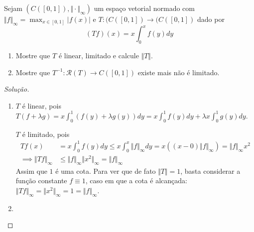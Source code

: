 \documentclass{article}
\theoremstyle{definition}
\numberwithin{equation}{section}
\begin{document}
	\begin{exer}
		Sejam $(C([0,1]),\Vert\cdot\Vert_\infty)$ um espaço vetorial normado com $\Vert f\Vert_\infty=\max_{x\in[0,1]}|f(x)|$ e $T:(C([0,1])\to (C([0,1])$ dado por
		\[(Tf)(x)=x\int_0^xf(y)dy\]
		\begin{enumerate}
			\item Mostre que $T$ é linear, limitado e calcule $\Vert T\Vert$.
			\item Mostre que $T^{-1}:\mathcal{R}(T)\to C([0,1])$ existe mais não é limitado.
		\end{enumerate}
	\end{exer}
	\begin{proof}[Solução]\leavevmode
		\begin{enumerate}
			\item $T$ é linear, pois $T(f+\lambda g)=x\int_0^1(f(y)+\lambda g(y))dy=x\int_0^1f(y)dy+\lambda x\int_0^1g(y)dy$.
			
			$T$ é limitado, pois
			\begin{align*}
				Tf(x)&=x\int_0^1f(y)dy\leq x\int_0^x\Vert f\Vert_\infty dy= x\left((x-0)\Vert f\Vert_\infty\right)=\Vert f\Vert_\infty x^2\\
				\implies
				\Vert Tf\Vert_\infty&\leq \Vert f\Vert_\infty \Vert x^2\Vert_\infty=\Vert f\Vert_\infty
			\end{align*}
			Assim que $1$ é uma cota. Para ver que de fato $\Vert T\Vert=1$, basta considerar a função constante $f\equiv1$, caso em que a cota é alcançada: $\Vert Tf\Vert_\infty=\Vert x^2\Vert_\infty=1=\Vert f\Vert_\infty$.
			
			\item 
		\end{enumerate}
	\end{proof}
	\fi
\end{document}
